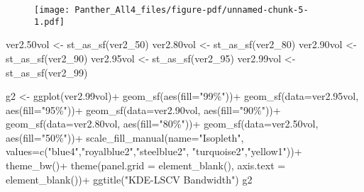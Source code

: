 \documentclass[
  letterpaper,
]{book}
\newenvironment{Shaded}{\begin{snugshade}}{\end{snugshade}}
\newcommand{\AttributeTok}[1]{\textcolor[rgb]{0.40,0.45,0.13}{#1}}
\newcommand{\FloatTok}[1]{\textcolor[rgb]{0.68,0.00,0.00}{#1}}
\newcommand{\FunctionTok}[1]{\textcolor[rgb]{0.28,0.35,0.67}{#1}}
\newcommand{\NormalTok}[1]{\textcolor[rgb]{0.00,0.23,0.31}{#1}}
\newcommand{\OtherTok}[1]{\textcolor[rgb]{0.00,0.23,0.31}{#1}}
\newcommand{\SpecialCharTok}[1]{\textcolor[rgb]{0.37,0.37,0.37}{#1}}
\newcommand{\StringTok}[1]{\textcolor[rgb]{0.13,0.47,0.30}{#1}}
\begin{document}
\begin{figure}[H]

{\centering \texttt{[image: Panther\_All4\_files/figure-pdf/unnamed-chunk-5-1.pdf]}

}

\end{figure}

\begin{Shaded}
\begin{Highlighting}[]
\NormalTok{ver2}\FloatTok{.50}\NormalTok{vol }\OtherTok{\textless{}{-}} \FunctionTok{st\_as\_sf}\NormalTok{(ver2\_50)}
\NormalTok{ver2}\FloatTok{.80}\NormalTok{vol }\OtherTok{\textless{}{-}} \FunctionTok{st\_as\_sf}\NormalTok{(ver2\_80)}
\NormalTok{ver2}\FloatTok{.90}\NormalTok{vol }\OtherTok{\textless{}{-}} \FunctionTok{st\_as\_sf}\NormalTok{(ver2\_90)}
\NormalTok{ver2}\FloatTok{.95}\NormalTok{vol }\OtherTok{\textless{}{-}} \FunctionTok{st\_as\_sf}\NormalTok{(ver2\_95)}
\NormalTok{ver2}\FloatTok{.99}\NormalTok{vol }\OtherTok{\textless{}{-}} \FunctionTok{st\_as\_sf}\NormalTok{(ver2\_99)}

\NormalTok{g2 }\OtherTok{\textless{}{-}} \FunctionTok{ggplot}\NormalTok{(ver2}\FloatTok{.99}\NormalTok{vol)}\SpecialCharTok{+}
  \FunctionTok{geom\_sf}\NormalTok{(}\FunctionTok{aes}\NormalTok{(}\AttributeTok{fill=}\StringTok{"99\%"}\NormalTok{))}\SpecialCharTok{+}
  \FunctionTok{geom\_sf}\NormalTok{(}\AttributeTok{data=}\NormalTok{ver2}\FloatTok{.95}\NormalTok{vol, }\FunctionTok{aes}\NormalTok{(}\AttributeTok{fill=}\StringTok{"95\%"}\NormalTok{))}\SpecialCharTok{+} 
  \FunctionTok{geom\_sf}\NormalTok{(}\AttributeTok{data=}\NormalTok{ver2}\FloatTok{.90}\NormalTok{vol, }\FunctionTok{aes}\NormalTok{(}\AttributeTok{fill=}\StringTok{"90\%"}\NormalTok{))}\SpecialCharTok{+}
  \FunctionTok{geom\_sf}\NormalTok{(}\AttributeTok{data=}\NormalTok{ver2}\FloatTok{.80}\NormalTok{vol, }\FunctionTok{aes}\NormalTok{(}\AttributeTok{fill=}\StringTok{"80\%"}\NormalTok{))}\SpecialCharTok{+}
  \FunctionTok{geom\_sf}\NormalTok{(}\AttributeTok{data=}\NormalTok{ver2}\FloatTok{.50}\NormalTok{vol, }\FunctionTok{aes}\NormalTok{(}\AttributeTok{fill=}\StringTok{"50\%"}\NormalTok{))}\SpecialCharTok{+}
  \FunctionTok{scale\_fill\_manual}\NormalTok{(}\AttributeTok{name=}\StringTok{"Isopleth"}\NormalTok{, }\AttributeTok{values=}\FunctionTok{c}\NormalTok{(}\StringTok{"blue4"}\NormalTok{,}\StringTok{"royalblue2"}\NormalTok{,}\StringTok{"steelblue2"}\NormalTok{, }\StringTok{"turquoise2"}\NormalTok{,}\StringTok{"yellow1"}\NormalTok{))}\SpecialCharTok{+}
  \FunctionTok{theme\_bw}\NormalTok{()}\SpecialCharTok{+}
  \FunctionTok{theme}\NormalTok{(}\AttributeTok{panel.grid =} \FunctionTok{element\_blank}\NormalTok{(), }\AttributeTok{axis.text =} \FunctionTok{element\_blank}\NormalTok{())}\SpecialCharTok{+}
  \FunctionTok{ggtitle}\NormalTok{(}\StringTok{"KDE{-}LSCV Bandwidth"}\NormalTok{)}
\NormalTok{g2}
\end{Highlighting}
\end{Shaded}
\end{document}
